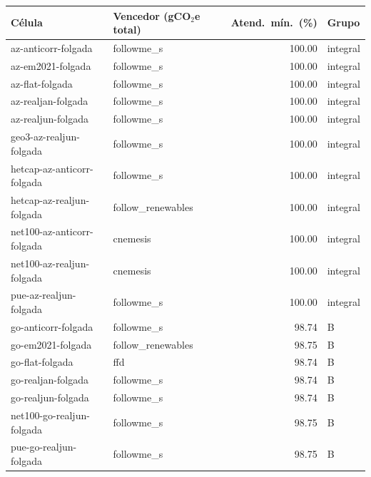 \begin{tabular}{llrl}
\toprule
Célula & Vencedor (gCO$_2$e total) & Atend.\ mín.\ (\%) & Grupo \\
\midrule
az-anticorr-folgada & followme\_s & 100.00 & integral \\
az-em2021-folgada & followme\_s & 100.00 & integral \\
az-flat-folgada & followme\_s & 100.00 & integral \\
az-realjan-folgada & followme\_s & 100.00 & integral \\
az-realjun-folgada & followme\_s & 100.00 & integral \\
geo3-az-realjun-folgada & followme\_s & 100.00 & integral \\
hetcap-az-anticorr-folgada & followme\_s & 100.00 & integral \\
hetcap-az-realjun-folgada & follow\_renewables & 100.00 & integral \\
net100-az-anticorr-folgada & cnemesis & 100.00 & integral \\
net100-az-realjun-folgada & cnemesis & 100.00 & integral \\
pue-az-realjun-folgada & followme\_s & 100.00 & integral \\
go-anticorr-folgada & followme\_s & 98.74 & B \\
go-em2021-folgada & follow\_renewables & 98.75 & B \\
go-flat-folgada & ffd & 98.74 & B \\
go-realjan-folgada & followme\_s & 98.74 & B \\
go-realjun-folgada & followme\_s & 98.74 & B \\
net100-go-realjun-folgada & followme\_s & 98.75 & B \\
pue-go-realjun-folgada & followme\_s & 98.75 & B \\
\bottomrule
\end{tabular}
